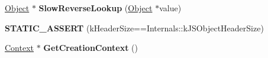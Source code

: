 \begin{DoxyCompactItemize}
\item 
\hypertarget{classv8_1_1internal_1_1_j_s_object_ab8ea3e6f2a56010d4cb64faf49c87216}{}\hyperlink{classv8_1_1internal_1_1_object}{Object} $\ast$ {\bfseries Slow\+Reverse\+Lookup} (\hyperlink{classv8_1_1internal_1_1_object}{Object} $\ast$value)\label{classv8_1_1internal_1_1_j_s_object_ab8ea3e6f2a56010d4cb64faf49c87216}

\item 
\hypertarget{classv8_1_1internal_1_1_j_s_object_a627ceb9c7966102a33d1f0df7d74ca3c}{}{\bfseries S\+T\+A\+T\+I\+C\+\_\+\+A\+S\+S\+E\+R\+T} (k\+Header\+Size==Internals\+::k\+J\+S\+Object\+Header\+Size)\label{classv8_1_1internal_1_1_j_s_object_a627ceb9c7966102a33d1f0df7d74ca3c}

\item 
\hypertarget{classv8_1_1internal_1_1_j_s_object_a8cc6f62c7b5f743646f60328d18dd8ba}{}\hyperlink{classv8_1_1internal_1_1_context}{Context} $\ast$ {\bfseries Get\+Creation\+Context} ()\label{classv8_1_1internal_1_1_j_s_object_a8cc6f62c7b5f743646f60328d18dd8ba}

\end{DoxyCompactItemize}
